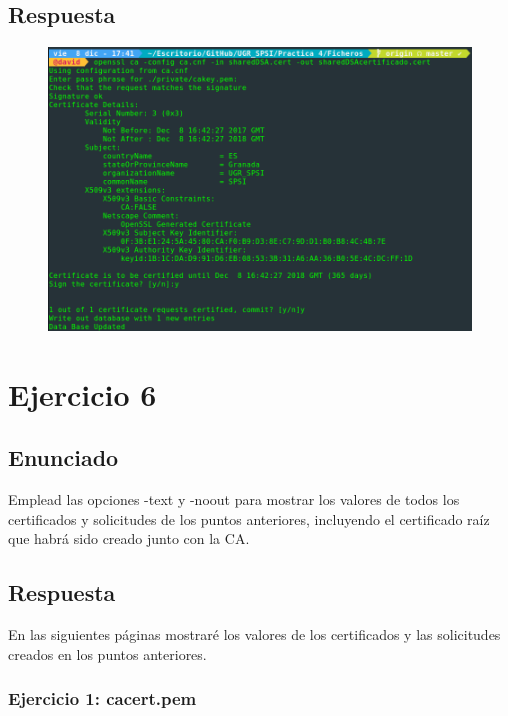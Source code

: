 \documentclass[10pt,a4paper,spanish]{report}
\begin{document}
\section{Respuesta}
\noindent
\begin{figure}[!hbp]
 \centering  \includegraphics[width=1\textwidth]{./Imagenes/5.png}
\end{figure}

\chapter{Ejercicio 6}

\section{Enunciado}
\noindent
Emplead las opciones -text y -noout para mostrar los valores de todos los certificados y solicitudes de los puntos anteriores, incluyendo el certificado raíz que habrá sido creado junto con la CA.

\section{Respuesta}
\noindent
En las siguientes páginas mostraré los valores de los certificados y las solicitudes creados en los puntos anteriores.

\newpage
\subsection*{Ejercicio 1: cacert.pem}
\end{document}
